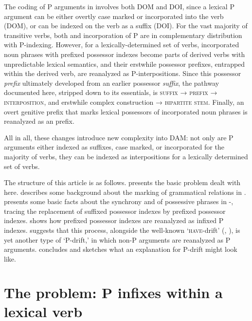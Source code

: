 \documentclass[output=paper]{LSP/langsci}
\begin{document}
The coding of P arguments in  involves both DOM and DOI, since a lexical P argument can be either overtly case marked or incorporated into the verb (DOM), or can be indexed on the verb as a suffix (DOI). For the vast majority of transitive verbs, both  and incorporation of P are in complementary distribution with P-indexing. However, for a lexically-determined set of verbs, incorporated noun phrases with prefixed possessor indexes become parts of derived verbs with unpredictable lexical semantics, and their erstwhile possessor prefixes, entrapped within the derived verb, are reanalyzed as P-interpositions. Since this possessor \textit{prefix} ultimately developed from an earlier possessor \textit{suffix}, the pathway documented here, stripped down to its essentials, is \textsc{suffix} → \textsc{prefix} → \textsc{interposition}, and erstwhile complex construction → \textsc{bipartite stem}. Finally, an overt genitive prefix that marks lexical possessors of incorporated noun phrases is reanalyzed as an  prefix. 

 All in all, these changes introduce new complexity into  DAM: not only are P arguments either indexed as suffixes, case marked, or incorporated for the majority of verbs, they can be indexed as interpositions for a lexically determined set of verbs. 

 The structure of this article is as follows.  presents the basic problem dealt with here.  describes some background about the marking of grammatical relations in .  presents some basic facts about the synchrony and  of possessive phrases in -, tracing the replacement of suffixed possessor indexes by prefixed possessor indexes.  shows how prefixed possessor indexes are reanalyzed as infixed P indexes.  suggests that this process, alongside the well-known ‘\textsc{have}-drift’ (\citealt{Comrie1981Language}, \citealt{Stassen2009Predicative}), is yet another type of ‘P-drift,’ in which non-P arguments are reanalyzed as P arguments.  concludes and sketches what an explanation for P-drift might look like.

\section{The problem: P infixes within a lexical verb}
\label{05-sec:2}
\end{document}
